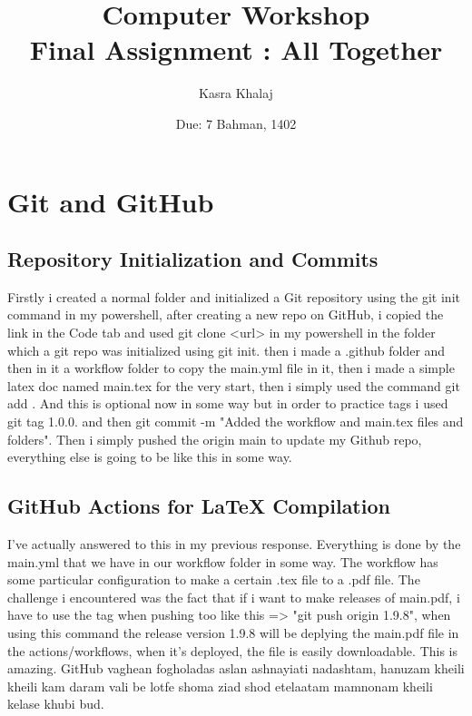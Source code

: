 \documentclass[12pt, letterpaper]{article}
\title{Computer Workshop\\ Final Assignment : All Together}
\author{Kasra Khalaj}
\date{Due: 7 Bahman, 1402}
\begin{document}
\maketitle
\newpage
{}
\large

\tableofcontents
\section{Git and GitHub}
\subsection{ Repository Initialization and Commits}
Firstly i created a normal folder and initialized a Git repository using the git init command in my powershell, after creating a new repo on GitHub, i copied the link in the Code tab and used git clone <url> in my powershell in the folder which a git repo was initialized using git init. then i made a .github folder and then in it a workflow folder to copy the main.yml file in it, then i made a 
 simple latex doc named main.tex for the very start, then i simply used the command git add . And this is optional now in some way but in order to practice tags i used git tag 1.0.0. and then git commit -m "Added the workflow and main.tex files and folders". Then i simply pushed the origin main to update my Github repo, everything else is going to be like this in some way.
 \subsection{GitHub Actions for LaTeX Compilation}
 I've actually answered to this in my previous response. Everything is done by the main.yml that we have in our workflow folder in some way. The workflow has some particular configuration to make a certain .tex file to a .pdf file. The challenge i encountered was the fact that if i want to make releases of main.pdf, i have to use the tag when pushing too like this => "git push origin 1.9.8", when using this command the release version 1.9.8 will be deplying the main.pdf file in the actions/workflows, when it's deployed, the file is easily downloadable. This is amazing. GitHub vaghean fogholadas aslan ashnayiati nadashtam, hanuzam kheili kheili kam daram vali be lotfe shoma ziad shod etelaatam mamnonam kheili kelase khubi bud.
\end{document}
